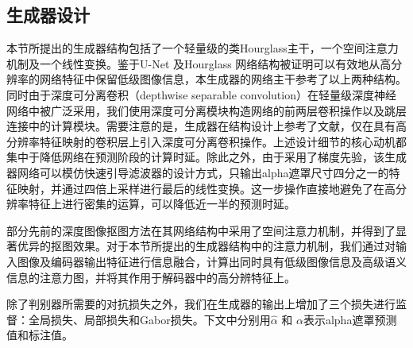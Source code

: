 \subsection{生成器设计}
本节所提出的生成器结构包括了一个轻量级的类Hourglass\cite{newell2016stacked}主干，一个空间注意力机制及一个线性变换。鉴于U-Net\cite{ronneberger2015u} 及Hourglass \cite{newell2016stacked}网络结构被证明可以有效地从高分辨率的网络特征中保留低级图像信息，本生成器的网络主干参考了以上两种结构。同时由于深度可分离卷积（depthwise separable convolution）在轻量级深度神经网络中被广泛采用\cite{chollet2017xception,howard2017mobilenets,zhang2018shufflenet,sandler2018mobilenetv2}，我们使用深度可分离模块构造网络的前两层卷积操作以及跳层连接中的计算模块。需要注意的是，生成器在结构设计上参考了文献\parencite{nekrasov2018real}，仅在具有高分辨率特征映射的卷积层上引入深度可分离卷积操作。上述设计细节的核心动机都集中于降低网络在预测阶段的计算时延。除此之外，由于采用了梯度先验，该生成器网络可以模仿快速引导滤波器\cite{he2015fast}的设计方式，只输出alpha遮罩尺寸四分之一的特征映射，并通过四倍上采样进行最后的线性变换。这一步操作直接地避免了在高分辨率特征上进行密集的运算，可以降低近一半的预测时延。

部分先前的深度图像抠图方法\cite{chen2018semantic,zhu2017fast}在其网络结构中采用了空间注意力机制\cite{xu2015show}，并得到了显著优异的抠图效果。对于本节所提出的生成器结构中的注意力机制，我们通过对输入图像及编码器输出特征进行信息融合，计算出同时具有低级图像信息及高级语义信息的注意力图，并将其作用于解码器中的高分辨特征上。

除了判别器所需要的对抗损失之外，我们在生成器的输出上增加了三个损失进行监督：全局损失、局部损失和Gabor损失。下文中分别用$ \hat{\alpha} $ 和 $ {\alpha} $表示alpha遮罩预测值和标注值。

